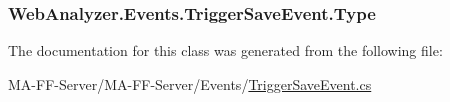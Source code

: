 \subsubsection[{Type}]{ Web\+Analyzer.\+Events.\+Trigger\+Save\+Event.\+Type\hspace{0.3cm}{\ttfamily [get]}}\label{class_web_analyzer_1_1_events_1_1_trigger_save_event_af54a984dcddf28a5f41eb60d11b3d1b1}


The documentation for this class was generated from the following file\+:\begin{DoxyCompactItemize}
\item 
M\+A-\/\+F\+F-\/\+Server/\+M\+A-\/\+F\+F-\/\+Server/\+Events/\hyperlink{_trigger_save_event_8cs}{Trigger\+Save\+Event.\+cs}\end{DoxyCompactItemize}
